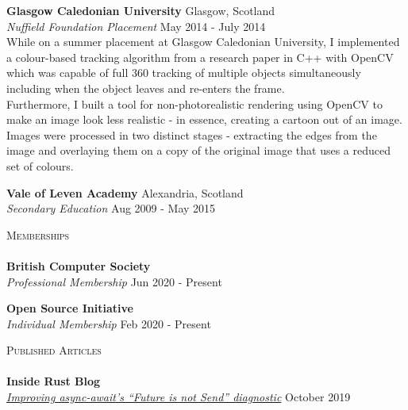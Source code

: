 \documentclass[a4paper]{article}
\newcommand{\lineunder} {
  \vspace*{-8pt} \\
  \hspace*{-18pt} \hrulefill \\
}
\newcommand{\header} [1] {
  {\hspace*{-18pt}\vspace*{6pt} \textsc{#1}}
  \vspace*{-6pt} \lineunder
}
\begin{document}
\textbf{Glasgow Caledonian University} \hfill {\color{gray} Glasgow, Scotland} \\
\textit{Nuffield Foundation Placement} \hfill {\color{gray} May 2014 - July 2014} \\
\vspace{2mm}
While on a summer placement at Glasgow Caledonian University, I implemented a colour-based
tracking algorithm from a research paper in C++ with OpenCV \footnotemark[4] \footnotemark[5] which
was capable of full 360 tracking of multiple objects simultaneously including when the object
leaves and re-enters the frame. \\
\vspace{2mm}
Furthermore, I built a tool for non-photorealistic rendering using OpenCV to make an image look
less realistic - in essence, creating a cartoon out of an image. Images were processed in two
distinct stages - extracting the edges from the image and overlaying them on a copy of the
original image that uses a reduced set of colours.
\vspace{2mm}

\textbf{Vale of Leven Academy} \hfill {\color{gray} Alexandria, Scotland} \\
\textit{Secondary Education} \hfill {\color{gray} Aug 2009 - May 2015} \\
\vspace{2mm}

\header{Memberships}
\textbf{British Computer Society} \\
\textit{Professional Membership} \hfill {\color{gray} Jun 2020 - Present} \\
\vspace{2mm}

\textbf{Open Source Initiative} \\
\textit{Individual Membership} \hfill {\color{gray} Feb 2020 - Present} \\
\vspace{2mm}

\header{Published Articles}
\textbf{Inside Rust Blog} \\
\textit{\href{https://blog.rust-lang.org/inside-rust/2019/10/11/AsyncAwait-Not-Send-Error-Improvements.html}{Improving async-await's ``Future is not Send'' diagnostic}} \hfill {\color{gray} October 2019} \\
\vspace{2mm}

\end{document}
